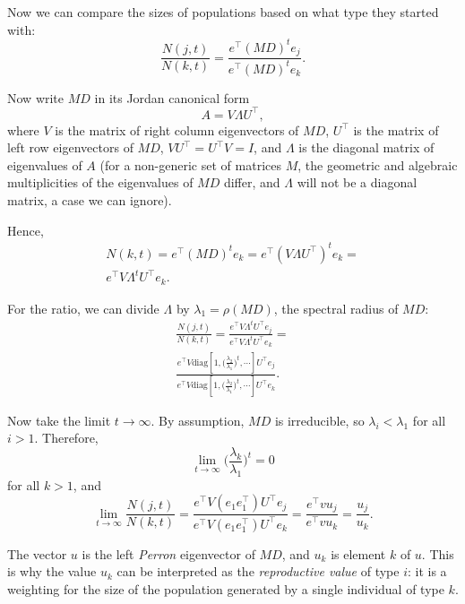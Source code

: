 \documentclass[9pt, a4paper, twocolumn]{extarticle}
\newcommand*{\tr}{^\intercal}
\newcommand{\matrx}[1]{{\left[ \stackrel{}{#1}\right]}}
\newcommand{\diag}[1]{\mbox{diag}\matrx{#1}}
\newcommand{\goesto}{\rightarrow}
\begin{document}
Now we can compare the sizes of populations based on what type they started
with:
\begin{equation}
\frac{N(j,t)}{N(k,t)} = \frac{e\tr (MD)^t e_j}{e\tr (MD)^t e_k}.
\end{equation}

Now write $MD$ in its Jordan canonical form 
\begin{equation}
A = V \Lambda U\tr,
\end{equation}
where $V$ is the matrix of right column eigenvectors of $MD$,
$U\tr$ is the matrix of left row eigenvectors of $MD$,
$V U\tr = U\tr V = I$, 
and $\Lambda$ is the diagonal matrix of eigenvalues of $A$ 
(for a non-generic set of matrices $M$, the geometric and algebraic multiplicities of the eigenvalues of $MD$ differ, and $\Lambda$ will not be a diagonal matrix, a case we can ignore).

Hence,
\begin{multline}
N(k, t) = 
e\tr (MD)^t e_k =
e\tr  (V \Lambda U\tr)^t e_k = \\
e\tr V \Lambda^t U\tr e_k.
\end{multline}

For the ratio, we can divide $\Lambda$ by $\lambda_1 = \rho(MD)$,
the spectral radius of $MD$:
\begin{multline}
\frac{N(j,t)}{N(k,t)} =
\frac{ e\tr V \Lambda^t U\tr e_j}{ e\tr V \Lambda^t U\tr e_k} = \\
\frac{ e\tr V \diag{1, \Big(\frac{\lambda_2}{\lambda_1}\Big)^t, \cdots} U\tr e_j} { e\tr V \diag{1,\Big(\frac{\lambda_2}{\lambda_1}\Big)^t, \cdots} U\tr e_k}.
\end{multline}

Now take the limit $t \goesto \infty$.
By assumption, $MD$ is irreducible, so $\lambda_i < \lambda_1$ for all $i > 1$.
Therefore,
\begin{equation}
\lim_{t \goesto \infty} \Big( \frac{\lambda_k}{\lambda_1} \Big)^t = 0
\end{equation}
for all $k > 1$, and
\begin{equation}
\lim_{t \goesto \infty}\frac{N(j,t)}{N(k,t)} =
\frac{e\tr V (e_1 e_1\tr) U\tr e_j} { e\tr V (e_1 e_1\tr) U\tr e_k} = 
\frac{ e\tr v u_j} { e\tr v  u_k} =
\frac{u_j} {u_k}.
\end{equation}

The vector $u$ is the left \emph{Perron} eigenvector of $MD$, and $u_k$ is element $k$ of $u$.
This is why the value $u_k$ can be interpreted as the \emph{reproductive value} of type $i$: it is a weighting for the size of the population generated by a single individual of type $k$.
\end{document}
